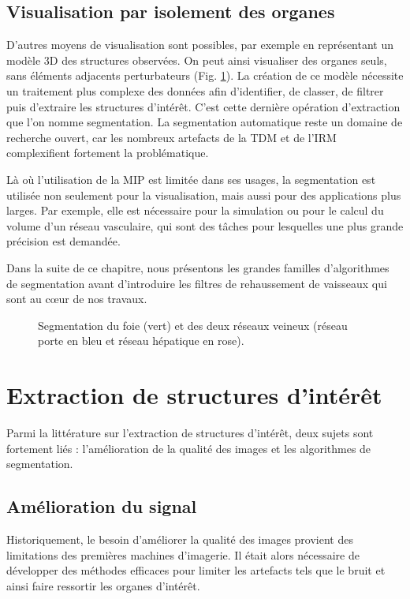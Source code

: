       \subsection{Visualisation par isolement des organes}
      D'autres moyens de visualisation sont possibles, par exemple en représentant un modèle 3D des structures observées. On peut ainsi visualiser des organes seuls, sans éléments adjacents perturbateurs (Fig. \ref{fig:segmentation_3D}). La création de ce modèle nécessite un traitement plus complexe des données afin d'identifier, de classer, de filtrer puis d'extraire les structures d'intérêt. C'est cette dernière opération d'extraction que l'on nomme segmentation. La segmentation automatique reste un domaine de recherche ouvert, car les nombreux artefacts de la TDM et de l'IRM complexifient fortement la problématique.
      
      Là où l'utilisation de la MIP est limitée dans ses usages, la segmentation est utilisée non seulement pour la visualisation, mais aussi pour des applications plus larges. Par exemple, elle est nécessaire pour la simulation ou pour le calcul du volume d'un réseau vasculaire, qui sont des tâches pour lesquelles une plus grande précision est demandée.
      
      Dans la suite de ce chapitre, nous présentons les grandes familles d'algorithmes de segmentation avant d'introduire les filtres de rehaussement de vaisseaux qui sont au cœur de nos travaux.
      \begin{figure}[h]
        \centering
        \caption{Segmentation du foie (vert) et des deux réseaux veineux (réseau porte en bleu et réseau hépatique en rose).}
        \label{fig:segmentation_3D}
      \end{figure}
  \section{Extraction de structures d'intérêt}
      Parmi la littérature sur l'extraction de structures d'intérêt, deux sujets sont fortement liés : l'amélioration de la qualité des images et les algorithmes de segmentation.
    \subsection{Amélioration du signal}
    Historiquement, le besoin d'améliorer la qualité des images provient des limitations des premières machines d'imagerie. Il était alors nécessaire de développer des méthodes efficaces pour limiter les artefacts tels que le bruit et ainsi faire ressortir les organes d'intérêt. 
    
